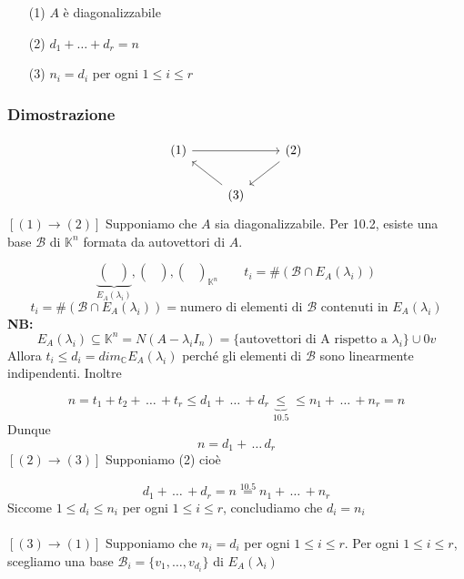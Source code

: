 \documentclass[12pt]{article}
\begin{document}
\begin{enumerate}
    \item[(1)] $A$ è diagonalizzabile
    \item[(2)] $d_1 + \dots + d_r = n$
    \item[(3)] $n_i = d_i$ per ogni $1 \le i \le r$
\end{enumerate}

\subsubsection{Dimostrazione}

\begin{equation*}
\begin{tikzcd}
 (1) \arrow[rr] &  & (2) \arrow[dl]\\
& (3) \arrow[ul] &
\end{tikzcd}
\end{equation*}
$[(1) \rightarrow (2)]$ Supponiamo che $A$ sia diagonalizzabile. Per 10.2, esiste una base $\mathcal{B}$ di $\mathbb{K}^n$ formata da autovettori di $A$.

\[\underbrace{\begin{pmatrix}
\\
\\
\end{pmatrix}}_{E_A(\lambda_i)}, \begin{pmatrix}
  \\
  \\
\end{pmatrix}, \begin{pmatrix}
    \\
    \\
\end{pmatrix}_{\mathbb{K}^n} \quad \quad t_i = \# (\mathcal{B} \cap E_A(\lambda_i))\]
\[t_i = \# (\mathcal{B} \cap E_A(\lambda_i)) = \text{numero di elementi di $\mathcal{B}$ contenuti in $E_A(\lambda_i)$}\]
\textbf{NB: }
\[E_A(\lambda_i) \subseteq \mathbb{K}^n = N(A - \lambda_i I_n) = \{ \text{autovettori di A rispetto a } \lambda_i\} \cup {0v}\]
Allora $t_i  \le d_i = dim_{\mathbb{C}}E_A(\lambda_i)$ perché gli elementi di $\mathcal{B}$ sono linearmente indipendenti. Inoltre

\[n = t_1 + t_2 + \, \dots \, + t_r \le d_1 + \, \dots \, + d_r \underbrace{\le}_{10.5} \le  n_1 + \, \dots \, + n_r = n\]
Dunque
\[n = d_1 + \, \dots \, d_r\]
$[(2) \rightarrow (3)]$ Supponiamo (2) cioè

\[d_1 + \, \dots \, +  d_r = n \stackrel{10.5}{=} n_1 + \, \dots \, + n_r \]
Siccome $1 \le d_i \le n_i$ per ogni $1 \le i \le r$, concludiamo che $d_i = n_i$\\\\
$[(3) \rightarrow (1)]$ Supponiamo che $n_i = d_i$ per ogni $1 \le i \le r$. Per ogni $1 \le i \le r$, scegliamo una base $\mathcal{B}_i = \{v_1, \dots, v_{d_i}\}$ di $E_A(\lambda_i)$
\end{document}
